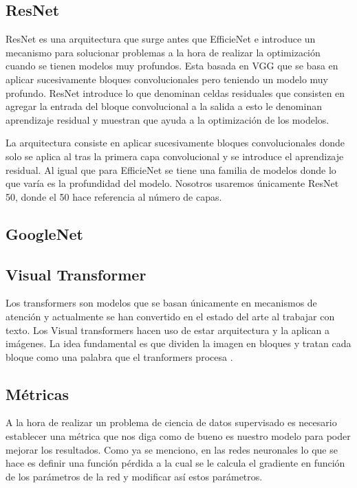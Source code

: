 \documentclass[a4paper,12pt,twoside,titlepage]{article}
\begin{document}
\subsection*{ResNet}
ResNet es una arquitectura que surge antes que EfficieNet e introduce un mecanismo para solucionar problemas a la hora de realizar la optimización cuando se tienen modelos muy profundos. Esta basada en VGG \cite{} que se basa en aplicar sucesivamente bloques convolucionales pero teniendo un modelo muy profundo. ResNet introduce lo que denominan celdas residuales que consisten en agregar la entrada del bloque convolucional a la salida \cite{} a esto le denominan aprendizaje residual y muestran que ayuda a la optimización de los modelos.

La arquitectura consiste en aplicar sucesivamente bloques convolucionales donde solo se aplica al tras la primera capa convolucional y se introduce el aprendizaje residual. Al igual que para EfficieNet se tiene una familia de modelos donde lo que varía es la profundidad del modelo. Nosotros usaremos únicamente ResNet 50, donde el 50 hace referencia al número de capas.

\subsection*{GoogleNet}

\subsection*{Visual Transformer}

Los transformers \cite{} son modelos que se basan únicamente en mecanismos de atención y actualmente se han convertido en el estado del arte al trabajar con texto. Los Visual transformers hacen uso de estar arquitectura y la aplican a imágenes. La idea fundamental es que dividen la imagen en bloques y tratan cada bloque como una palabra que el tranformers procesa \cite{}.

\subsection{Métricas}

A la hora de realizar un problema de ciencia de datos supervisado es necesario establecer una métrica que nos diga como de bueno es nuestro modelo para poder mejorar los resultados. Como ya se menciono, en las redes neuronales lo que se hace es definir una función pérdida a la cual se le calcula el gradiente en función de los parámetros de la red y modificar así estos parámetros.
\end{document}
